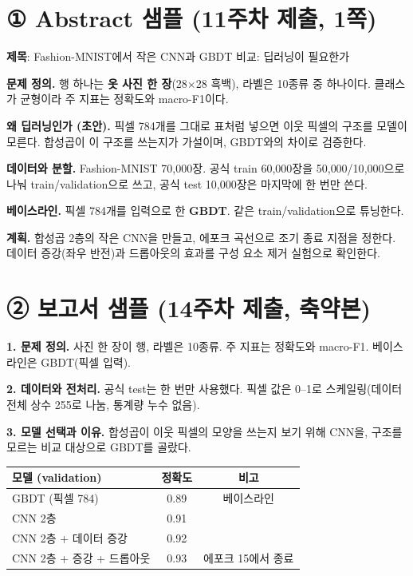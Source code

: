 \documentclass[11pt]{article}
\begin{document}


\section*{① Abstract 샘플 (11주차 제출, 1쪽)}
\noindent\textbf{제목}: Fashion-MNIST에서 작은 CNN과 GBDT 비교: 딥러닝이 필요한가

\vspace{4pt}
\noindent\textbf{문제 정의.} 행 하나는 \textbf{옷 사진 한 장}(28$\times$28 흑백), 라벨은 10종류 중 하나이다. 클래스가 균형이라 주 지표는 정확도와 macro-F1이다.

\noindent\textbf{왜 딥러닝인가 (초안).} 픽셀 784개를 그대로 표처럼 넣으면 이웃 픽셀의 구조를 모델이 모른다. 합성곱이 이 구조를 쓰는지가 가설이며, GBDT와의 차이로 검증한다.

\noindent\textbf{데이터와 분할.} Fashion-MNIST 70{,}000장. 공식 train 60{,}000장을 50{,}000/10{,}000으로 나눠 train/validation으로 쓰고, 공식 test 10{,}000장은 마지막에 한 번만 쓴다.

\noindent\textbf{베이스라인.} 픽셀 784개를 입력으로 한 \textbf{GBDT}. 같은 train/validation으로 튜닝한다.

\noindent\textbf{계획.} 합성곱 2층의 작은 CNN을 만들고, 에포크 곡선으로 조기 종료 지점을 정한다. 데이터 증강(좌우 반전)과 드롭아웃의 효과를 구성 요소 제거 실험으로 확인한다.

\newpage
\section*{② 보고서 샘플 (14주차 제출, 축약본)}
\noindent\textbf{1. 문제 정의.} 사진 한 장이 행, 라벨은 10종류. 주 지표는 정확도와 macro-F1. 베이스라인은 GBDT(픽셀 입력).

\noindent\textbf{2. 데이터와 전처리.} 공식 test는 한 번만 사용했다. 픽셀 값은 0--1로 스케일링(데이터 전체 상수 255로 나눔, 통계량 누수 없음).

\noindent\textbf{3. 모델 선택과 이유.} 합성곱이 이웃 픽셀의 모양을 쓰는지 보기 위해 CNN을, 구조를 모르는 비교 대상으로 GBDT를 골랐다.

\begin{center}\small
\begin{tabular}{@{}lcc@{}}\toprule
모델 (validation) & 정확도 & 비고 \\\midrule
GBDT (픽셀 784) & 0.89 & 베이스라인 \\
CNN 2층 & 0.91 & \\
CNN 2층 + 데이터 증강 & 0.92 & \\
CNN 2층 + 증강 + 드롭아웃 & 0.93 & 에포크 15에서 종료 \\\bottomrule
\end{tabular}
\end{center}
\end{document}
